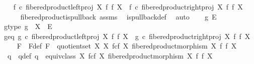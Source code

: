 \begin{isabellebody}
\ \ \isamarkupfalse%
\ {\isachardoublequoteopen}f\ {\isasymcirc}\isactrlsub c\ fibered{\isacharunderscore}{\kern0pt}product{\isacharunderscore}{\kern0pt}left{\isacharunderscore}{\kern0pt}proj\ X\ f\ f\ X\ {\isacharequal}{\kern0pt}\ f\ {\isasymcirc}\isactrlsub c\ fibered{\isacharunderscore}{\kern0pt}product{\isacharunderscore}{\kern0pt}right{\isacharunderscore}{\kern0pt}proj\ X\ f\ f\ X{\isachardoublequoteclose}\isanewline
\ \ \ \ \isamarkupfalse%
\ fibered{\isacharunderscore}{\kern0pt}product{\isacharunderscore}{\kern0pt}is{\isacharunderscore}{\kern0pt}pullback\ assms\ \isamarkupfalse%
\ is{\isacharunderscore}{\kern0pt}pullback{\isacharunderscore}{\kern0pt}def\ \isamarkupfalse%
\ auto\isanewline
{}\isamarkupfalse%
\isanewline
\ \ \isamarkupfalse%
\ g\ E\isanewline
\ \ \isamarkupfalse%
\ g{\isacharunderscore}{\kern0pt}type{\isacharcolon}{\kern0pt}\ {\isachardoublequoteopen}g\ {\isacharcolon}{\kern0pt}\ X\ {\isasymrightarrow}\ E{\isachardoublequoteclose}\isanewline
\ \ \isamarkupfalse%
\ g{\isacharunderscore}{\kern0pt}eq{\isacharcolon}{\kern0pt}\ {\isachardoublequoteopen}g\ {\isasymcirc}\isactrlsub c\ fibered{\isacharunderscore}{\kern0pt}product{\isacharunderscore}{\kern0pt}left{\isacharunderscore}{\kern0pt}proj\ X\ f\ f\ X\ {\isacharequal}{\kern0pt}\ g\ {\isasymcirc}\isactrlsub c\ fibered{\isacharunderscore}{\kern0pt}product{\isacharunderscore}{\kern0pt}right{\isacharunderscore}{\kern0pt}proj\ X\ f\ f\ X{\isachardoublequoteclose}\isanewline
\isanewline
\ \ \isamarkupfalse%
\ \ F\ \ F{\isacharunderscore}{\kern0pt}def{\isacharcolon}{\kern0pt}\ {\isachardoublequoteopen}F\ {\isacharequal}{\kern0pt}\ quotient{\isacharunderscore}{\kern0pt}set\ X\ {\isacharparenleft}{\kern0pt}X\ \isactrlbsub f\isactrlesub {\isasymtimes}\isactrlsub c\isactrlbsub f\isactrlesub \ X{\isacharcomma}{\kern0pt}\ fibered{\isacharunderscore}{\kern0pt}product{\isacharunderscore}{\kern0pt}morphism\ X\ f\ f\ X{\isacharparenright}{\kern0pt}{\isachardoublequoteclose}\isanewline
\ \ \isamarkupfalse%
\ \ q\ \ q{\isacharunderscore}{\kern0pt}def{\isacharcolon}{\kern0pt}\ {\isachardoublequoteopen}q\ {\isacharequal}{\kern0pt}\ equiv{\isacharunderscore}{\kern0pt}class\ {\isacharparenleft}{\kern0pt}X\ \isactrlbsub f\isactrlesub {\isasymtimes}\isactrlsub c\isactrlbsub f\isactrlesub \ X{\isacharcomma}{\kern0pt}\ fibered{\isacharunderscore}{\kern0pt}product{\isacharunderscore}{\kern0pt}morphism\ X\ f\ f\ X{\isacharparenright}{\kern0pt}{\isachardoublequoteclose}\ \isanewline

\end{isabellebody}
